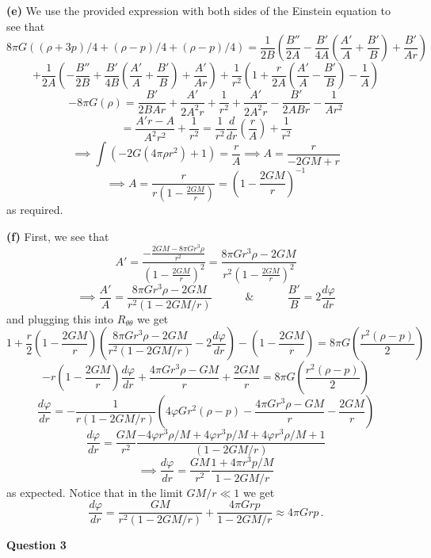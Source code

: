\documentclass[10pt]{article}
\newcommand{\del}[2][]{\frac{d #1}{d #2}}
\begin{document}
\textbf{(e)} We use the provided expression with both sides of the Einstein equation to see that
\[ 8\pi G\left((\rho + 3p)/4 + (\rho - p)/4 + (\rho - p)/4\right) = \frac{1}{2B}\left(\frac{B''}{2A} - \frac{B'}{4A}\left(\frac{A'}{A} + \frac{B'}{B}\right) + \frac{B'}{Ar}\right) \]
\[ + \frac{1}{2A}\left(-\frac{B''}{2B} + \frac{B'}{4B}\left(\frac{A'}{A} + \frac{B'}{B}\right) + \frac{A'}{Ar}\right) + \frac{1}{r^{2}}\left(1 + \frac{r}{2A}\left(\frac{A'}{A} - \frac{B'}{B}\right) - \frac{1}{A}\right) \]
\[ -8\pi G(\rho) = \frac{B'}{2BAr} + \frac{A'}{2A^{2}r} + \frac{1}{r^{2}} + \frac{A'}{2A^{2}r} - \frac{B'}{2ABr} - \frac{1}{Ar^{2}} \]
\[ = \frac{A'r - A}{A^{2}r^{2}} + \frac{1}{r^{2}} = \frac{1}{r^{2}}\del{r}\left(\frac{r}{A}\right) + \frac{1}{r^{2}}\]
\[ \implies \int\left(-2G(4\pi\rho r^{2})  + 1\right) = \frac{r}{A} \implies A = \frac{r}{-2GM + r} \]
\[ \implies A = \frac{r}{r\left(1 - \frac{2GM}{r}\right)} = \left(1 - \frac{2GM}{r}\right)^{-1} \]
as required.

\textbf{(f)} First, we see that
\[ A' = \frac{-\frac{2GM - 8\pi Gr^{3} \rho}{r^{2}}}{\left(1 - \frac{2GM}{r}\right)^{2}}  =\frac{8\pi Gr^{3}\rho - 2GM}{r^{2}\left(1 - \frac{2GM}{r}\right)^{2}} \]
\[ \implies \frac{A'}{A} = \frac{8\pi Gr^{3}\rho - 2GM}{r^{2}\left(1 - 2GM/r\right)} \hspace{3em} \& \hspace{3em} \frac{B'}{B} = 2\del[\varphi]{r} \]
and plugging this into $R_{\theta\theta}$ we get
\[1 + \frac{r}{2}\left(1 - \frac{2GM}{r}\right)\left(\frac{8\pi Gr^{3}\rho - 2GM}{r^{2}\left(1 - 2GM/r\right)} - 2\del[\varphi]{r}\right) - \left(1 - \frac{2GM}{r}\right) = 8\pi G\left(\frac{r^{2}(\rho - p)}{2}\right) \]
\[ -r\left(1 - \frac{2GM}{r}\right)\del[\varphi]{r} + \frac{4\pi Gr^{3}\rho - GM}{r} + \frac{2GM}{r} = 8\pi G\left(\frac{r^{2}(\rho - p)}{2}\right)\]
\[ \del[\varphi]{r} = -\frac{1}{r\left(1 - 2GM/r\right)}\left(4\varphi Gr^{2}(\rho - p) -\frac{4\pi Gr^{3}\rho - GM}{r} - \frac{2GM}{r}\right) \]
\[ \del[\varphi]{r} = \frac{GM}{r^{2}}\frac{-4\varphi r^{3}\rho/M + 4\varphi r^{3}p/M + 4\varphi r^{3}\rho/M + 1}{(1 - 2GM/r)}\]
\[\implies \del[\varphi]{r} = \frac{GM}{r^{2}}\frac{1 + 4\pi r^{3}p/M}{1- 2GM/r} \]
as expected. Notice that in the limit $GM/r \ll  1$ we get
\[ \del[\varphi]{r} = \frac{GM}{r^{2}(1 - 2GM/r)} + \frac{4\pi Grp}{1 - 2GM/r} \approx 4\pi Grp \, .\]

\newpage
\textbf{Question 3}
\end{document}
